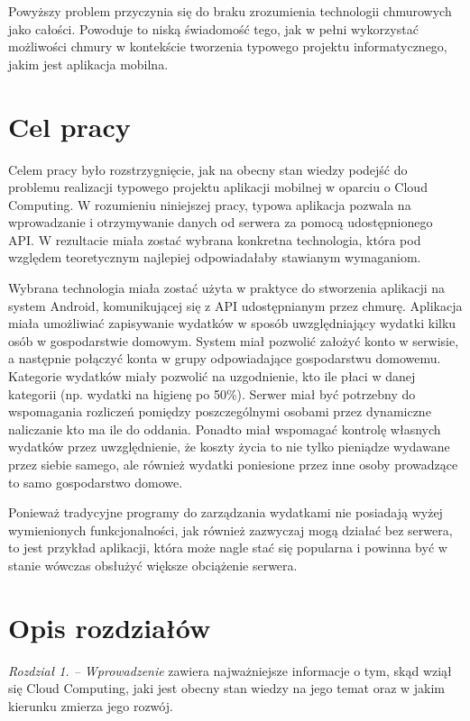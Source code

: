 \documentclass[12pt,a4paper,twoside,titlepage,openright]{book}
\begin{document}
Powyższy problem przyczynia się do braku zrozumienia technologii chmurowych jako całości. Powoduje to niską świadomość tego, jak w pełni wykorzystać możliwości chmury w kontekście tworzenia typowego projektu informatycznego, jakim jest aplikacja mobilna.





\section*{Cel pracy}


Celem pracy było rozstrzygnięcie, jak na obecny stan wiedzy podejść do problemu realizacji typowego projektu aplikacji mobilnej w oparciu o Cloud Computing. W rozumieniu niniejszej pracy, typowa aplikacja pozwala na wprowadzanie i otrzymywanie danych od serwera za pomocą udostępnionego API. W rezultacie miała zostać wybrana konkretna technologia, która pod względem teoretycznym najlepiej odpowiadałaby stawianym wymaganiom.

Wybrana technologia miała zostać użyta w praktyce do stworzenia aplikacji na system Android, komunikującej się z API udostępnianym przez chmurę. Aplikacja miała umożliwiać zapisywanie wydatków w sposób uwzględniający wydatki kilku osób w gospodarstwie domowym. System miał pozwolić założyć konto w serwisie, a następnie połączyć konta w grupy odpowiadające gospodarstwu domowemu. Kategorie wydatków miały pozwolić na uzgodnienie, kto ile płaci w danej kategorii (np. wydatki na higienę po 50\%). Serwer miał być potrzebny do wspomagania rozliczeń pomiędzy poszczególnymi osobami przez dynamiczne naliczanie kto ma ile do oddania. Ponadto miał wspomagać kontrolę własnych wydatków przez uwzględnienie, że koszty życia to nie tylko pieniądze wydawane przez siebie samego, ale również wydatki poniesione przez inne osoby prowadzące to samo gospodarstwo domowe. 

Ponieważ tradycyjne programy do zarządzania wydatkami nie posiadają wyżej wymienionych funkcjonalności, jak również zazwyczaj mogą działać bez serwera, to jest przykład aplikacji, która może nagle stać się popularna i powinna być w stanie wówczas obsłużyć większe obciążenie serwera. 



\section*{Opis rozdziałów}
\textit{Rozdział 1. -- Wprowadzenie} zawiera najważniejsze informacje o tym, skąd wziął się Cloud Computing, jaki jest obecny stan wiedzy na jego temat oraz w jakim kierunku zmierza jego rozwój. 
\end{document}
